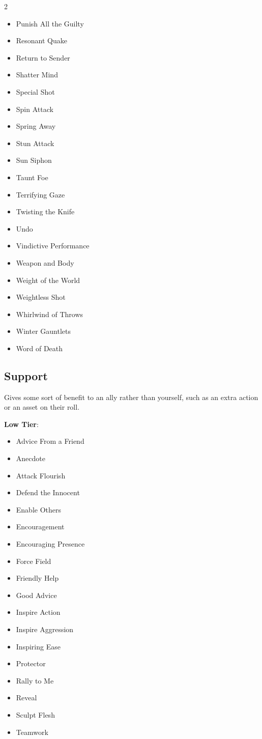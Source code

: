 \begin{multicols}{2}
\begin{itemize}
\item Punish All the Guilty
\item Resonant Quake
\item Return to Sender
\item Shatter Mind
\item Special Shot
\item Spin Attack
\item Spring Away
\item Stun Attack
\item Sun Siphon
\item Taunt Foe
\item Terrifying Gaze
\item Twisting the Knife
\item Undo
\item Vindictive Performance
\item Weapon and Body
\item Weight of the World
\item Weightless Shot
\item Whirlwind of Throws
\item Winter Gauntlets
\item Word of Death
\end{itemize}

\subsection{Support}

Gives some sort of benefit to an ally rather than yourself, such as an extra action or an asset on their roll.

\textbf{Low Tier}:

\begin{itemize}
\item Advice From a Friend
\item Anecdote
\item Attack Flourish
\item Defend the Innocent
\item Enable Others
\item Encouragement
\item Encouraging Presence
\item Force Field
\item Friendly Help
\item Good Advice
\item Inspire Action
\item Inspire Aggression
\item Inspiring Ease
\item Protector
\item Rally to Me
\item Reveal
\item Sculpt Flesh
\item Teamwork
\end{itemize}


\end{multicols}
